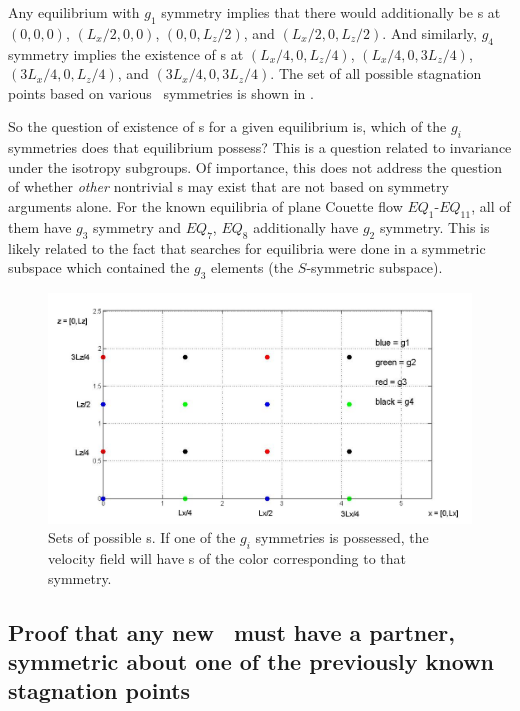 \documentclass[letter,12pt,openany]{article}
\begin{document}
 Any equilibrium with $g_1$ symmetry implies that there would additionally be \stagp s at $(0,0,0)$, $(L_{x}/2,0,0)$, $(0,0,L_{z}/2)$, and
$(L_{x}/2,0,L_{z}/2)$. And similarly, $g_4$ symmetry implies the existence of
\stagp s at $(L_{x}/4,0,L_{z}/4)$, $(L_{x}/4,0,3L_{z}/4)$,
$(3L_{x}/4,0,L_{z}/4)$, and $(3L_{x}/4,0,3L_{z}/4)$. The set of all possible stagnation points based on various \pCf\ symmetries
 is shown in .

So the question of existence of \stagp s for a given equilibrium is, which of the
$g_i$ symmetries does that equilibrium possess? This is a question related to
invariance under the isotropy subgroups. Of importance, this does not
address the question of whether \textit{other} nontrivial \stagp s may exist that are not based on symmetry arguments alone. For the known equilibria of plane Couette flow $EQ_1$-$EQ_{11}$, all of
them have $g_3$ symmetry and $EQ_7$, $EQ_8$ additionally have $g_2$ symmetry. This is likely related to the fact that searches for
equilibria were done in a symmetric subspace which contained the
$g_3$ elements (the $S$-symmetric subspace). \\


\begin{figure}[!h]
\includegraphics[width=1.0\textwidth]{stags7_26.jpg}
  \caption{
   Sets of possible \stagp s. If one of the $g_i$ symmetries is
   possessed, the velocity field will have \stagp s of the color
   corresponding to that symmetry.
   }
  \label{eltonFig:stags7_26}
 \end{figure}



\subsection{Proof that any new \stagp\ must have a partner, symmetric about one of the previously known stagnation points}
\end{document}
